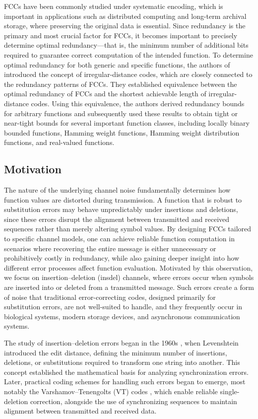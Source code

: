 \documentclass[11 pt]{article}
\numberwithin{equation}{section}
\begin{document}
FCCs have been commonly studied under systematic encoding, which is important in applications such as distributed computing and long-term archival storage, where preserving the original data is essential. Since redundancy is the primary and most crucial factor for FCCs, it becomes important to precisely determine optimal redundancy—that is, the minimum number of additional bits required to guarantee correct computation of the intended function. To determine optimal redundancy for both generic and specific functions, the authors of \cite{10132545} introduced the concept of irregular-distance codes, which are closely connected to the redundancy patterns of FCCs. They established equivalence between the optimal redundancy of FCCs and the shortest achievable length of irregular-distance codes. Using this equivalence, the authors derived redundancy bounds for arbitrary functions and subsequently used these results to obtain tight or near-tight bounds for several important function classes, including locally binary bounded functions, Hamming weight functions, Hamming weight distribution functions, and real-valued functions.

 
 \subsection{Motivation}
    The nature of the underlying channel noise fundamentally determines how function values are distorted during transmission. A function that is robust to substitution errors may behave unpredictably under insertions and deletions, since these errors disrupt the alignment between transmitted and received sequences rather than merely altering symbol values. By designing FCCs tailored to specific channel models, one can achieve reliable function computation in scenarios where recovering the entire message is either unnecessary or prohibitively costly in redundancy, while also gaining deeper insight into how different error processes affect function evaluation. Motivated by this observation, we focus on insertion–deletion (insdel) channels, where errors occur when symbols are inserted into or deleted from a transmitted message. Such errors create a form of noise that traditional error-correcting codes, designed primarily for substitution errors, are not well-suited to handle, and they frequently occur in biological systems, modern storage devices, and asynchronous communication systems.

    The study of insertion–deletion errors began in the 1960s \cite{varshamov1965codes,levenshtein1965двоичные, levenshtein1967asymptotically, tenengolts1984nonbinary}, when Levenshtein introduced the edit distance, defining the minimum number of insertions, deletions, or substitutions required to transform one string into another. This concept established the mathematical basis for analyzing synchronization errors. Later, practical coding schemes for handling such errors began to emerge, most notably the Varshamov–Tenengolts (VT) codes \cite{varshamov1965codes}, which enable reliable single-deletion correction, alongside the use of synchronizing sequences to maintain alignment between transmitted and received data.
\end{document}
